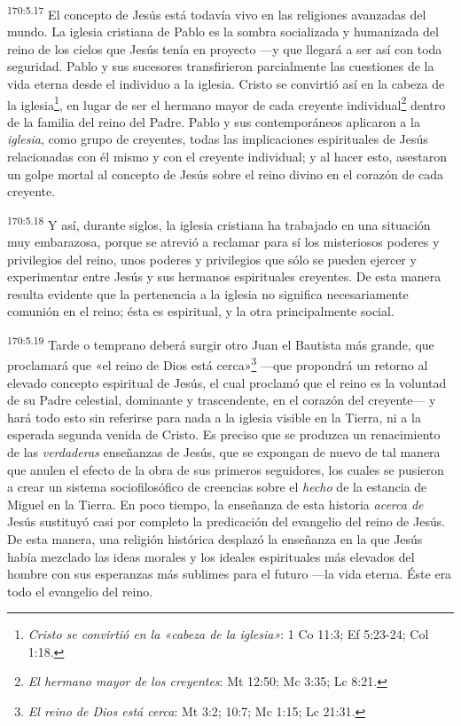 \par 
\textsuperscript{170:5.17} El concepto de Jesús está todavía vivo en las religiones avanzadas del mundo. La iglesia cristiana de Pablo es la sombra socializada y humanizada del reino de los cielos que Jesús tenía en proyecto ---y que llegará a ser así con toda seguridad. Pablo y sus sucesores transfirieron parcialmente las cuestiones de la vida eterna desde el individuo a la iglesia. Cristo se convirtió así en la cabeza de la iglesia\footnote{\textit{Cristo se convirtió en la «cabeza de la iglesia»}: 1 Co 11:3; Ef 5:23-24; Col 1:18.}, en lugar de ser el hermano mayor de cada creyente individual\footnote{\textit{El hermano mayor de los creyentes}: Mt 12:50; Mc 3:35; Lc 8:21.} dentro de la familia del reino del Padre. Pablo y sus contemporáneos aplicaron a la \textit{iglesia}, como grupo de creyentes, todas las implicaciones espirituales de Jesús relacionadas con él mismo y con el creyente individual; y al hacer esto, asestaron un golpe mortal al concepto de Jesús sobre el reino divino en el corazón de cada creyente.

\par 
\textsuperscript{170:5.18} Y así, durante siglos, la iglesia cristiana ha trabajado en una situación muy embarazosa, porque se atrevió a reclamar para sí los misteriosos poderes y privilegios del reino, unos poderes y privilegios que sólo se pueden ejercer y experimentar entre Jesús y sus hermanos espirituales creyentes. De esta manera resulta evidente que la pertenencia a la iglesia no significa necesariamente comunión en el reino; ésta es espiritual, y la otra principalmente social.

\par 
\textsuperscript{170:5.19} Tarde o temprano deberá surgir otro Juan el Bautista más grande, que proclamará que «el reino de Dios está cerca»\footnote{\textit{El reino de Dios está cerca}: Mt 3:2; 10:7; Mc 1:15; Lc 21:31.} ---que propondrá un retorno al elevado concepto espiritual de Jesús, el cual proclamó que el reino es la voluntad de su Padre celestial, dominante y trascendente, en el corazón del creyente--- y hará todo esto sin referirse para nada a la iglesia visible en la Tierra, ni a la esperada segunda venida de Cristo. Es preciso que se produzca un renacimiento de las \textit{verdaderas} enseñanzas de Jesús, que se expongan de nuevo de tal manera que anulen el efecto de la obra de sus primeros seguidores, los cuales se pusieron a crear un sistema sociofilosófico de creencias sobre el \textit{hecho} de la estancia de Miguel en la Tierra. En poco tiempo, la enseñanza de esta historia \textit{acerca de} Jesús sustituyó casi por completo la predicación del evangelio del reino de Jesús. De esta manera, una religión histórica desplazó la enseñanza en la que Jesús había mezclado las ideas morales y los ideales espirituales más elevados del hombre con sus esperanzas más sublimes para el futuro ---la vida eterna. Éste era todo el evangelio del reino.


